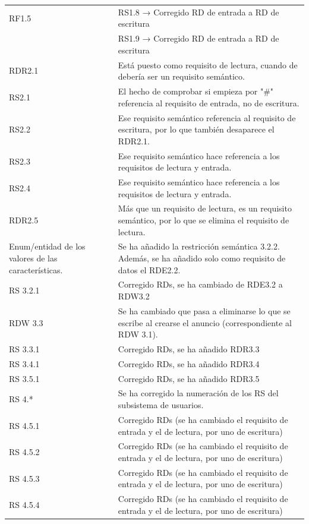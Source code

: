 \begin{longtable}{|p{3cm}|p{11cm}|}
RF1.5 & RS1.8 → Corregido RD de entrada a RD de escritura\\
      & RS1.9 → Corregido RD de entrada a RD de escritura\\
\hline



RDR2.1 & Está puesto como requisito de lectura, cuando de debería ser un requisito semántico.\\
\hline

RS2.1 & El hecho de comprobar si empieza por "\#" referencia al requisito de entrada, no de escritura.\\
\hline

RS2.2 & Ese requisito semántico referencia al requisito de escritura, por lo que también desaparece el RDR2.1.\\
\hline

RS2.3 & Ese requisito semántico hace referencia a los requisitos de lectura y entrada.\\
\hline

RS2.4 & Ese requisito semántico hace referencia a los requisitos de lectura y entrada.\\
\hline

RDR2.5 & Más que un requisito de lectura, es un requisito semántico, por lo que se elimina el requisito de lectura.\\
\hline

Enum/entidad de los valores de las características. & Se ha añadido la restricción semántica 3.2.2. Además, se ha añadido solo como requisito de datos el RDE2.2. \\
\hline

RS 3.2.1 & Corregido RDs, se ha cambiado de RDE3.2 a RDW3.2 \\
\hline

RDW 3.3 & Se ha cambiado que pasa a eliminarse lo que se escribe al crearse el anuncio (correspondiente al RDW 3.1). \\
\hline

RS 3.3.1 & Corregido RDs, se ha añadido RDR3.3\\
\hline

RS 3.4.1 & Corregido RDs, se ha añadido RDR3.4 \\
\hline

RS 3.5.1 & Corregido RDs, se ha añadido RDR3.5 \\
\hline

RS 4.* & Se ha corregido la numeración de los RS del subsistema de usuarios. \\
\hline
RS 4.5.1 & Corregido RDs (se ha cambiado el requisito de entrada y el de lectura, por uno de escritura) \\
\hline
RS 4.5.2 & Corregido RDs (se ha cambiado el requisito de entrada y el de lectura, por uno de escritura)\\
\hline
RS 4.5.3 & Corregido RDs (se ha cambiado el requisito de entrada y el de lectura, por uno de escritura) \\
\hline
RS 4.5.4 & Corregido RDs (se ha cambiado el requisito de entrada y el de lectura, por uno de escritura)\\
\hline


\end{longtable}
